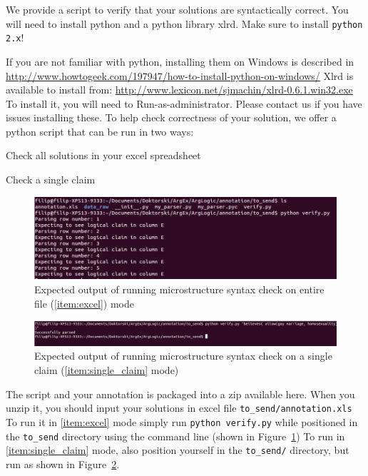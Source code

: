 We provide a script to verify that your solutions are syntactically correct. 
You will need to install python and a python library xlrd. Make sure to install
\texttt{python 2.x}!

If you are not familiar with python, installing them on Windows is described in
\url{http://www.howtogeek.com/197947/how-to-install-python-on-windows/}
Xlrd is available to install from:
\url{http://www.lexicon.net/sjmachin/xlrd-0.6.1.win32.exe} 
To install it, you will need to Run-as-administrator. 
Please contact us if you have issues installing these. 
To help check correctness of your solution, we offer a python script that can
be run in two ways:

\begin{description}[style=multiline, labelwidth=1.5cm]
\item[\namedlabel{item:excel}{All}] Check all solutions in your excel spreadsheet
\item[\namedlabel{item:single_claim}{Single}] Check a single claim
\end{description}

\begin{figure}
	\includegraphics[scale=0.5]{struc_instructions_1.png}
	\caption{Expected output of running microstructure syntax check on entire file (\ref{item:excel}) mode}
	\label{fig:struc_instructions_all}
\end{figure}

\begin{figure}
\includegraphics[scale=0.35]{struc_instructions_2.png}
	\caption{Expected output of running microstructure syntax check on a
	\label{fig:struc_instructions_2}
	single claim (\ref{item:single_claim} mode) }
\end{figure}

\noindent The script and your annotation is packaged into a zip available here. When you
unzip it, you should input your solutions in excel file \texttt{to\_send/annotation.xls}
To run it in \ref{item:excel} mode simply run \texttt{python verify.py} while
positioned in the \texttt{to\_send} directory using the command line (shown in
Figure~\ref{fig:struc_instructions_all}) To run in \ref{item:single_claim}
mode, also position yourself in the \texttt{to\_send/} directory, but run as
shown in Figure~\ref{fig:struc_instructions_2}.
